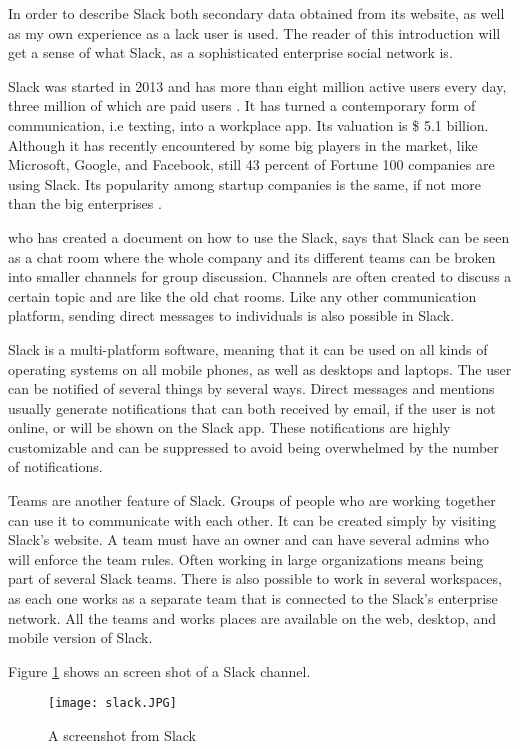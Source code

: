 In order to describe Slack both secondary data obtained from its website, as well as my own experience as a lack user is used. The reader of this introduction will get a sense of what Slack, as a sophisticated enterprise social network is.

Slack was started in 2013 and has more than eight million active users every day, three million of which are paid users \citep{Lynley2018}. It has turned a contemporary form of communication, i.e texting, into a workplace app. Its valuation is \$ 5.1 billion. Although it has recently encountered by some big players in the market, like Microsoft, Google, and Facebook, still 43 percent of Fortune 100 companies are using Slack. Its popularity among startup companies is the same, if not more than the big enterprises \citep{Rodriguez2018}.

\citet{Williams2015a} who has created a document on how to use the Slack, says that Slack can be seen as a chat room where the whole company and its different teams can be broken into smaller channels for group discussion. Channels are often created to discuss a certain topic and are like the old chat rooms. Like any other communication platform, sending direct messages to individuals is also possible in Slack.

Slack is a multi-platform software, meaning that it can be used on all kinds of operating systems on all mobile phones, as well as desktops and laptops. The user can be notified of several things by several ways. Direct messages and mentions usually generate notifications that can both received by email, if the user is not online, or will be shown on the Slack app. These notifications are highly customizable and can be suppressed to avoid being overwhelmed by the number of notifications. 

Teams are another feature of Slack. Groups of people who are working together can use it to communicate with each other. It can be created simply by visiting Slack's website. A team must have an owner and can have several admins who will enforce the team rules. Often working in large organizations means being part of several Slack teams. There is also possible to work in several workspaces, as each one works as a separate team that is connected to the Slack's enterprise network.  All the teams and works places are available on the web, desktop, and mobile version of Slack.

Figure \ref{fig:slack} shows an screen shot of a Slack channel.
\begin{figure}[hbt!]
\centering
\texttt{[image: slack.JPG]}
\caption{A screenshot from Slack}\label{fig:slack}
\end{figure}


